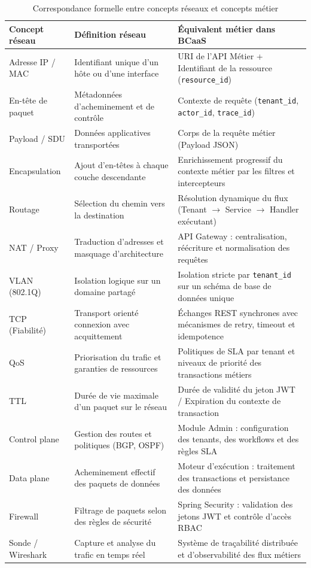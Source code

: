 \begin{table}[H]
\centering
\caption{Correspondance formelle entre concepts réseaux et concepts métier}
\label{tab:correspondance}
\renewcommand{\arraystretch}{1.3}
\footnotesize
\begin{tabularx}{\linewidth}{L{2.8cm} L{4.6cm} X}
\toprule
\textbf{Concept réseau} & \textbf{Définition réseau} & \textbf{Équivalent métier dans BCaaS} \\
\midrule
Adresse IP / MAC  & Identifiant unique d'un hôte ou d'une interface & URI de l'API Métier + Identifiant de la ressource (\texttt{resource\_id}) \\
En-tête de paquet & Métadonnées d'acheminement et de contrôle & Contexte de requête (\texttt{tenant\_id}, \texttt{actor\_id}, \texttt{trace\_id}) \\
Payload / SDU     & Données applicatives transportées & Corps de la requête métier (Payload JSON) \\
Encapsulation     & Ajout d'en-têtes à chaque couche descendante & Enrichissement progressif du contexte métier par les filtres et intercepteurs \\
Routage           & Sélection du chemin vers la destination & Résolution dynamique du flux (Tenant $\to$ Service $\to$ Handler exécutant) \\
NAT / Proxy       & Traduction d'adresses et masquage d'architecture & API Gateway : centralisation, réécriture et normalisation des requêtes \\
VLAN (802.1Q)     & Isolation logique sur un domaine partagé & Isolation stricte par \texttt{tenant\_id} sur un schéma de base de données unique \\
TCP (Fiabilité)   & Transport orienté connexion avec acquittement & Échanges REST synchrones avec mécanismes de retry, timeout et idempotence \\
QoS               & Priorisation du trafic et garanties de ressources & Politiques de SLA par tenant et niveaux de priorité des transactions métiers \\
TTL               & Durée de vie maximale d'un paquet sur le réseau & Durée de validité du jeton JWT / Expiration du contexte de transaction \\
Control plane     & Gestion des routes et politiques (BGP, OSPF) & Module Admin : configuration des tenants, des workflows et des règles SLA \\
Data plane        & Acheminement effectif des paquets de données & Moteur d'exécution : traitement des transactions et persistance des données \\
Firewall          & Filtrage de paquets selon des règles de sécurité & Spring Security : validation des jetons JWT et contrôle d'accès RBAC \\
Sonde / Wireshark & Capture et analyse du trafic en temps réel & Système de traçabilité distribuée et d'observabilité des flux métiers \\
\bottomrule
\end{tabularx}
\end{table}

